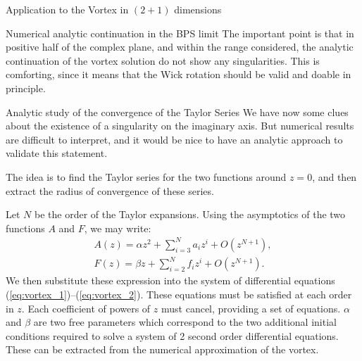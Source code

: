 \begin{section}{Application to the Vortex in $(2+1)$ dimensions}
\begin{subsection}{Numerical analytic continuation in the BPS limit}
    The important point is that in positive half of the complex plane,
    and within the range considered, the analytic continuation of
    the vortex solution do not show any singularities. This is
    comforting, since it means that the Wick rotation should be valid
    and doable in principle.
  \end{subsection}
  \begin{subsection}{Analytic study of the convergence of the Taylor Series}
    We have now some clues about the existence of a singularity on the
    imaginary axis. But numerical results are difficult to interpret,
    and it would be nice to have an analytic approach to validate
    this statement.

    The idea is to find the Taylor series for the two functions around
    $z = 0$, and then extract the radius of convergence of these
    series.

    Let $N$ be the order of the Taylor expansions. Using the
    asymptotics of the two functions $A$ and $F$, we may write:
    \begin{align}
      A(z) = \alpha z^2 + \sum_{i=3}^N a_iz^i +O(z^{N+1}),\\
      F(z) = \beta z+ \sum_{i=2}^N f_iz^i +O(z^{N+1}).
    \end{align}
    We then substitute these expression into the system of differential
    equations (\ref{eq:vortex_1})--(\ref{eq:vortex_2}). These equations
    must be satisfied at each order in $z$. Each coefficient of powers
    of $z$ must cancel, providing a set of equations. $\alpha$ and
    $\beta$ are two free parameters which correspond to the two
    additional initial conditions required to solve a system of 2 second
    order differential equations. These can be extracted from the
    numerical approximation of the vortex.


\end{subsection}
\end{section}
